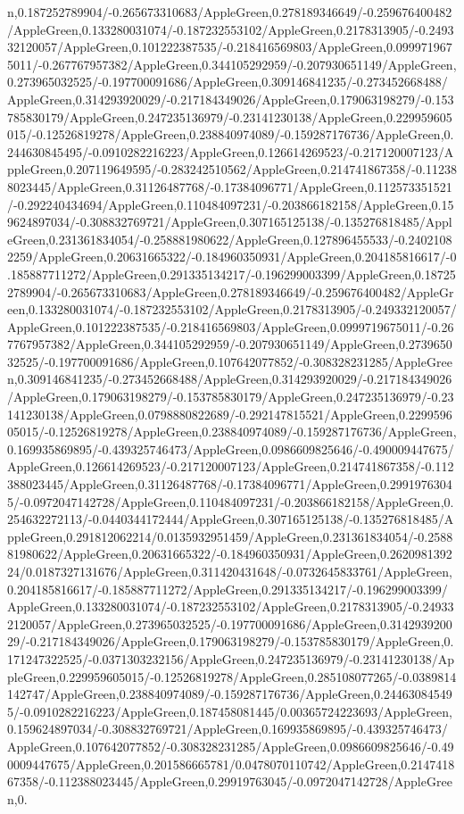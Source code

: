 {\begin{tikzternal}
{n,0.187252789904/-0.265673310683/AppleGreen,0.278189346649/-0.259676400482/AppleGreen,0.133280031074/-0.187232553102/AppleGreen,0.2178313905/-0.249332120057/AppleGreen,0.101222387535/-0.218416569803/AppleGreen,0.0999719675011/-0.267767957382/AppleGreen,0.344105292959/-0.207930651149/AppleGreen,0.273965032525/-0.197700091686/AppleGreen,0.309146841235/-0.273452668488/AppleGreen,0.314293920029/-0.217184349026/AppleGreen,0.179063198279/-0.153785830179/AppleGreen,0.247235136979/-0.23141230138/AppleGreen,0.229959605015/-0.12526819278/AppleGreen,0.238840974089/-0.159287176736/AppleGreen,0.244630845495/-0.0910282216223/AppleGreen,0.126614269523/-0.217120007123/AppleGreen,0.207119649595/-0.283242510562/AppleGreen,0.214741867358/-0.112388023445/AppleGreen,0.31126487768/-0.17384096771/AppleGreen,0.112573351521/-0.292240434694/AppleGreen,0.110484097231/-0.203866182158/AppleGreen,0.159624897034/-0.308832769721/AppleGreen,0.307165125138/-0.135276818485/AppleGreen,0.231361834054/-0.258881980622/AppleGreen,0.127896455533/-0.24021082259/AppleGreen,0.20631665322/-0.184960350931/AppleGreen,0.204185816617/-0.185887711272/AppleGreen,0.291335134217/-0.196299003399/AppleGreen,0.187252789904/-0.265673310683/AppleGreen,0.278189346649/-0.259676400482/AppleGreen,0.133280031074/-0.187232553102/AppleGreen,0.2178313905/-0.249332120057/AppleGreen,0.101222387535/-0.218416569803/AppleGreen,0.0999719675011/-0.267767957382/AppleGreen,0.344105292959/-0.207930651149/AppleGreen,0.273965032525/-0.197700091686/AppleGreen,0.107642077852/-0.308328231285/AppleGreen,0.309146841235/-0.273452668488/AppleGreen,0.314293920029/-0.217184349026/AppleGreen,0.179063198279/-0.153785830179/AppleGreen,0.247235136979/-0.23141230138/AppleGreen,0.0798880822689/-0.292147815521/AppleGreen,0.229959605015/-0.12526819278/AppleGreen,0.238840974089/-0.159287176736/AppleGreen,0.169935869895/-0.439325746473/AppleGreen,0.0986609825646/-0.490009447675/AppleGreen,0.126614269523/-0.217120007123/AppleGreen,0.214741867358/-0.112388023445/AppleGreen,0.31126487768/-0.17384096771/AppleGreen,0.29919763045/-0.0972047142728/AppleGreen,0.110484097231/-0.203866182158/AppleGreen,0.254632272113/-0.0440344172444/AppleGreen,0.307165125138/-0.135276818485/AppleGreen,0.291812062214/0.0135932951459/AppleGreen,0.231361834054/-0.258881980622/AppleGreen,0.20631665322/-0.184960350931/AppleGreen,0.262098139224/0.0187327131676/AppleGreen,0.311420431648/-0.0732645833761/AppleGreen,0.204185816617/-0.185887711272/AppleGreen,0.291335134217/-0.196299003399/AppleGreen,0.133280031074/-0.187232553102/AppleGreen,0.2178313905/-0.249332120057/AppleGreen,0.273965032525/-0.197700091686/AppleGreen,0.314293920029/-0.217184349026/AppleGreen,0.179063198279/-0.153785830179/AppleGreen,0.171247322525/-0.0371303232156/AppleGreen,0.247235136979/-0.23141230138/AppleGreen,0.229959605015/-0.12526819278/AppleGreen,0.285108077265/-0.0389814142747/AppleGreen,0.238840974089/-0.159287176736/AppleGreen,0.244630845495/-0.0910282216223/AppleGreen,0.187458081445/0.00365724223693/AppleGreen,0.159624897034/-0.308832769721/AppleGreen,0.169935869895/-0.439325746473/AppleGreen,0.107642077852/-0.308328231285/AppleGreen,0.0986609825646/-0.490009447675/AppleGreen,0.201586665781/0.0478070110742/AppleGreen,0.214741867358/-0.112388023445/AppleGreen,0.29919763045/-0.0972047142728/AppleGreen,0.}
\end{tikzternal}}
